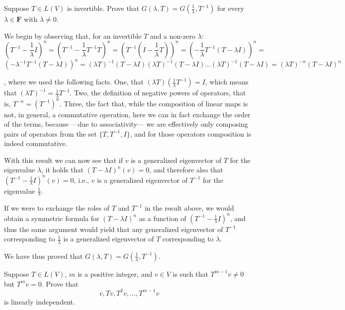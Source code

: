  \begin{exercise}{3}
     Suppose $T \in L(V)$ is invertible. Prove that $G(\lambda, T) = G(\frac{1}{\lambda}, T^{-1})$ for every $\lambda \in \mathbf{F}$ with $\lambda \neq 0$.
 \end{exercise}

 \begin{solution}
 
     We begin by observing that, for an invertible $T$ and a non-zero $\lambda$:
     $$(T^{-1} - \frac{1}{\lambda}I)^n = (T^{-1} - \frac{1}{\lambda} T^{-1}T)^n = (T^{-1}(I - \frac{1}{\lambda} T))^n = (-\frac{1}{\lambda}T^{-1}(T - \lambda I))^n = $$
     $$(-\lambda^{-1}T^{-1}(T - \lambda I))^n = (\lambda T)^{-1}(T - \lambda I)(\lambda T)^{-1}(T - \lambda I) \dots (\lambda T)^{-1}(T - \lambda I) = (\lambda T)^{-n}(T - \lambda I)^n$$

     , where we used the following facts. One, that $(\lambda T)(\frac{1}{\lambda} T^{-1}) = I$, which means that $(\lambda T)^{-1} = \frac{1}{\lambda} T^{-1}$. Two, the definition of negative powers of operators, that is, $T^{-n} = (T^{-1})^n$. Three, the fact that, while the composition of linear maps is not, in general, a commutative operation, here we can in fact exchange the order of the terms, because ---due to associativity--- we are effectively only composing pairs of operators from the set $\{T, T^{-1}, I\}$, and for those operators composition is indeed commutative.

     With this result we can now see that if $v$ is a generalized eigenvector of $T$ for the eigenvalue $\lambda$, it holds that $(T - \lambda I)^n(v) = 0$, and therefore also that $(T^{-1} - \frac{1}{\lambda}I)^n(v) = 0$, i.e., $v$ is a generalized eigenvector of $T^{-1}$ for the eigenvalue $\frac{1}{\lambda}$.

     If we were to exchange the roles of $T$ and $T^{-1}$ in the result above, we would obtain a symmetric formula for $(T - \lambda I)^n$ as a function of $(T^{-1} - \frac{1}{\lambda}I)^n$, and thus the same argument would yield that any generalized eigenvector of $T^{-1}$ corresponding to $\frac{1}{\lambda}$ is a generalized eigenvector of $T$ corresponding to $\lambda$.

     We have thus proved that $G(\lambda, T) = G(\frac{1}{\lambda}, T^{-1})$.
     
 \end{solution}

 \begin{exercise}{5}
     Suppose $T \in L(V)$, $m$ is a positive integer, and $v \in V$ is such that $T^{m-1}v \neq 0$ but $T^mv = 0$. Prove that
     $$v, Tv, T^2v, \ldots, T^{m-1}v$$
     is linearly independent.
 \end{exercise}

